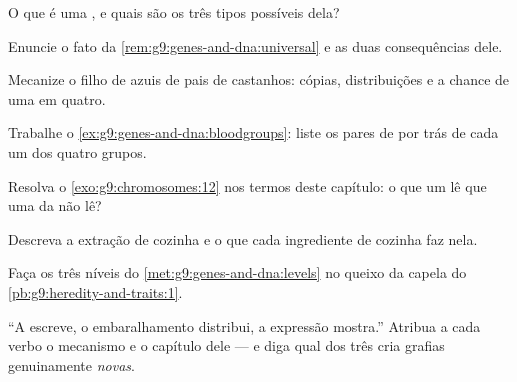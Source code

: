 \begin{exercise}[$\star$]\label{exo:g9:genes-and-dna:5}
O que é uma , e quais são os três tipos possíveis
dela?
\end{exercise}

\begin{exercise}[$\star$]\label{exo:g9:genes-and-dna:6}
Enuncie o fato da \cref{rem:g9:genes-and-dna:universal} e as
duas consequências dele.
\end{exercise}

\begin{exercise}[$\star\star$]\label{exo:g9:genes-and-dna:7}
Mecanize o filho de  azuis de pais de  castanhos:
cópias, distribuições e a chance de uma em quatro.
\end{exercise}

\begin{exercise}[$\star\star$]\label{exo:g9:genes-and-dna:8}
Trabalhe o \cref{ex:g9:genes-and-dna:bloodgroups}: liste os
pares de  por trás de cada um dos quatro grupos.
\end{exercise}

\begin{exercise}[$\star\star$]\label{exo:g9:genes-and-dna:9}
Resolva o \cref{exo:g9:chromosomes:12} nos termos deste
capítulo: o que um  lê que uma  da  não
lê?
\end{exercise}

\begin{exercise}[$\star\star$]\label{exo:g9:genes-and-dna:10}
Descreva a extração de cozinha e o que cada ingrediente de
cozinha faz nela.
\end{exercise}

\begin{exercise}[$\star\star$]\label{exo:g9:genes-and-dna:11}
Faça os três níveis do \cref{met:g9:genes-and-dna:levels} no
queixo da capela do \cref{pb:g9:heredity-and-traits:1}.
\end{exercise}

\begin{exercise}[$\star\star\star$]\label{exo:g9:genes-and-dna:12}
``A  escreve, o embaralhamento distribui, a expressão
mostra.'' Atribua a cada verbo o mecanismo e o capítulo dele
--- e diga qual dos três cria grafias genuinamente
\emph{novas}.
\end{exercise}


